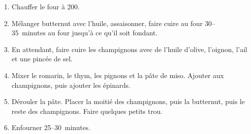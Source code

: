 
\begin{ingredients}
\end{ingredients}


\begin{recipe}
  \begin{enumerate}

  \item Chauffer le four à 200\degreeC.

  \item Mélanger butternut avec l'huile, assaisonner, faire cuire au
    four 30--35~minutes au four jusqu'à ce qu'il soit fondant.

  \item En attendant, faire cuire les champignons avec de l’huile
    d’olive, l’oignon, l'ail et une pincée de sel.

  \item Mixer le romarin, le thym, les pignons et la pâte de miso.
    Ajouter aux champignons, puis ajouter les épinards.

  \item Dérouler la pâte.  Placer la moitié des champignons, puis la
    butternut, puis le reste des champignons.  Faire quelques petits
    trou.

  \item Enfourner 25--30~minutes.

  \end{enumerate}
\end{recipe}

